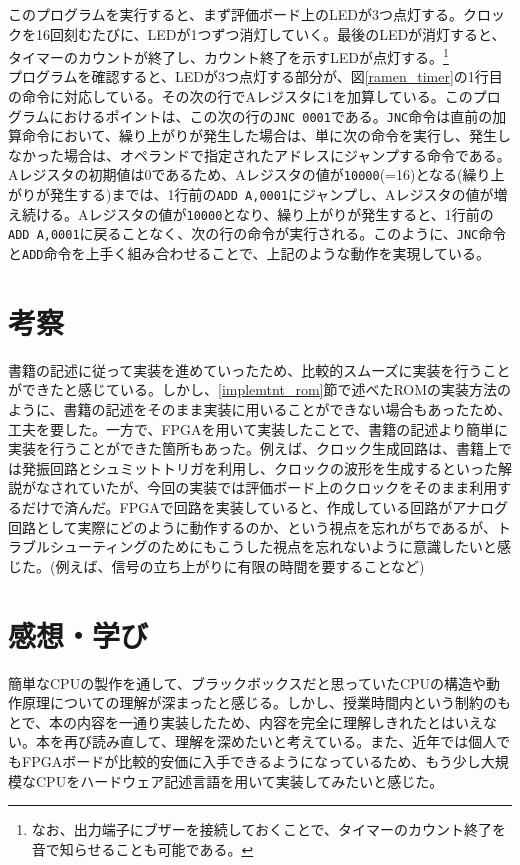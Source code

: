 \documentclass[dvipdfmx,a4j, titlepage]{jsarticle}
\begin{document}
このプログラムを実行すると、まず評価ボード上のLEDが3つ点灯する。クロックを16回刻むたびに、LEDが1つずつ消灯していく。最後のLEDが消灯すると、タイマーのカウントが終了し、カウント終了を示すLEDが点灯する。\footnote{なお、出力端子にブザーを接続しておくことで、タイマーのカウント終了を音で知らせることも可能である。}\\
プログラムを確認すると、LEDが3つ点灯する部分が、図\ref{ramen_timer}の1行目の命令に対応している。その次の行でAレジスタに1を加算している。このプログラムにおけるポイントは、この次の行の\verb|JNC 0001|である。\verb|JNC|命令は直前の加算命令において、繰り上がりが発生した場合は、単に次の命令を実行し、発生しなかった場合は、オペランドで指定されたアドレスにジャンプする命令である。Aレジスタの初期値は0であるため、Aレジスタの値が\verb|10000|(=16)となる(繰り上がりが発生する)までは、1行前の\verb|ADD A,0001|にジャンプし、Aレジスタの値が増え続ける。Aレジスタの値が\verb|10000|となり、繰り上がりが発生すると、1行前の\verb|ADD A,0001|に戻ることなく、次の行の命令が実行される。このように、\verb|JNC|命令と\verb|ADD|命令を上手く組み合わせることで、上記のような動作を実現している。\\

\section{考察}
書籍の記述に従って実装を進めていったため、比較的スムーズに実装を行うことができたと感じている。しかし、\ref{implemtnt_rom}節で述べたROMの実装方法のように、書籍の記述をそのまま実装に用いることができない場合もあったため、工夫を要した。一方で、FPGAを用いて実装したことで、書籍の記述より簡単に実装を行うことができた箇所もあった。例えば、クロック生成回路は、書籍上では発振回路とシュミットトリガを利用し、クロックの波形を生成するといった解説がなされていたが、今回の実装では評価ボード上のクロックをそのまま利用するだけで済んだ。FPGAで回路を実装していると、作成している回路がアナログ回路として実際にどのように動作するのか、という視点を忘れがちであるが、トラブルシューティングのためにもこうした視点を忘れないように意識したいと感じた。(例えば、信号の立ち上がりに有限の時間を要することなど)\\

\section{感想・学び}
簡単なCPUの製作を通して、ブラックボックスだと思っていたCPUの構造や動作原理についての理解が深まったと感じる。しかし、授業時間内という制約のもとで、本の内容を一通り実装したため、内容を完全に理解しきれたとはいえない。本を再び読み直して、理解を深めたいと考えている。また、近年では個人でもFPGAボードが比較的安価に入手できるようになっているため、もう少し大規模なCPUをハードウェア記述言語を用いて実装してみたいと感じた。
\end{document}
